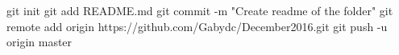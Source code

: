 
git init
git add README.md
git commit -m "Create readme of the folder"
git remote add origin https://github.com/Gabydc/December2016.git
git push -u origin master
